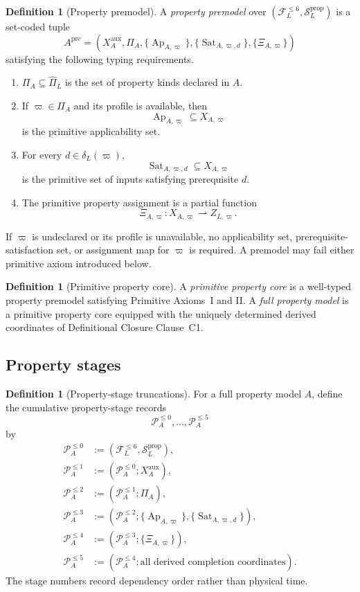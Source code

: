 \documentclass[11pt]{article}
\newcommand{\FVI}{\mathcal F_{L}^{\le 6}}
\newcommand{\Sprop}{\mathcal S_{L}^{\mathrm{prop}}}
\newcommand{\Pihat}{\widehat{\Pi}_{L}}
\newcommand{\Ap}{\operatorname{Ap}}
\newcommand{\Sat}{\operatorname{Sat}}
\theoremstyle{definition}
\newtheorem{definition}[theorem]{Definition}
\theoremstyle{remark}
\begin{document}
\begin{definition}[Property premodel]
\label{def:premodel}
A \emph{property premodel} over \((\FVI,\Sprop)\) is a set-coded tuple
\[
A^{\mathrm{pre}}=
\left(
X_A^{\mathrm{aux}},
\Pi_A,
\{\Ap_{A,\varpi}\},
\{\Sat_{A,\varpi,d}\},
\{\Xi_{A,\varpi}\}
\right)
\]
satisfying the following typing requirements.
\begin{enumerate}[label=(\arabic*)]
\item \(\Pi_A\subseteq\Pihat\) is the set of property kinds declared in \(A\).
\item If \(\varpi\in\Pi_A\) and its profile is available, then
\[
\Ap_{A,\varpi}\subseteq X_{A,\varpi}
\]
is the primitive applicability set.
\item For every \(d\in\delta_L(\varpi)\),
\[
\Sat_{A,\varpi,d}\subseteq X_{A,\varpi}
\]
is the primitive set of inputs satisfying prerequisite \(d\).
\item The primitive property assignment is a partial function
\[
\Xi_{A,\varpi}:X_{A,\varpi}\rightharpoonup Z_{L,\varpi}.
\]
\end{enumerate}
If \(\varpi\) is undeclared or its profile is unavailable, no applicability set, prerequisite-satisfaction set, or assignment map for \(\varpi\) is required.
A premodel may fail either primitive axiom introduced below.
\end{definition}

\begin{definition}[Primitive property core]
A \emph{primitive property core} is a well-typed property premodel satisfying Primitive Axioms~I and II.
A \emph{full property model} is a primitive property core equipped with the uniquely determined derived coordinates of Definitional Closure Clause~C1.
\end{definition}

\subsection{Property stages}

\begin{definition}[Property-stage truncations]
\label{def:property-stages}
For a full property model \(A\), define the cumulative property-stage records
\[
\mathcal P_A^{\le0},\ldots,\mathcal P_A^{\le5}
\]
by
\[
\begin{aligned}
\mathcal P_A^{\le0}&:=(\FVI,\Sprop),\\
\mathcal P_A^{\le1}&:=(\mathcal P_A^{\le0};X_A^{\mathrm{aux}}),\\
\mathcal P_A^{\le2}&:=(\mathcal P_A^{\le1};\Pi_A),\\
\mathcal P_A^{\le3}&:=(\mathcal P_A^{\le2};\{\Ap_{A,\varpi}\},\{\Sat_{A,\varpi,d}\}),\\
\mathcal P_A^{\le4}&:=(\mathcal P_A^{\le3};\{\Xi_{A,\varpi}\}),\\
\mathcal P_A^{\le5}&:=(\mathcal P_A^{\le4};\text{all derived completion coordinates}).
\end{aligned}
\]
The stage numbers record dependency order rather than physical time.
\end{definition}
\end{document}
